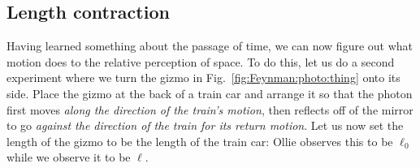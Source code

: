 \documentclass[12pt, oneside]{report}    %
\begin{document}
\begin{subappendices}
\subsection{Length contraction}

Having learned something about the passage of time, we can now figure out what motion does to the relative perception of space. To do this, let us do a second experiment where we turn the gizmo in Fig.~\ref{fig:Feynman:photo:thing} onto its side. Place the gizmo at the back of a train car and arrange it so that the photon first moves \emph{along the direction of the train's motion}, then reflects off of the mirror to go \emph{against the direction of the train for its return motion}. Let us now set the length of the gizmo to be the length of the train car: Ollie observes this to be $\ell_0$ while we observe it to be $\ell$. 


\end{subappendices}
\end{document}
